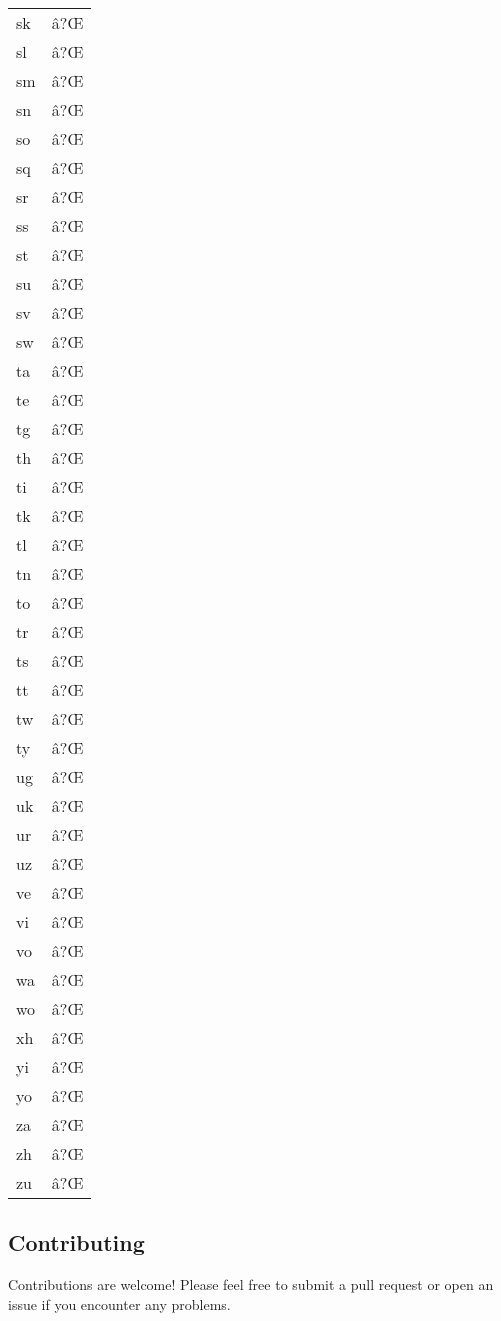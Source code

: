 \begin{longtable}[]{@{}ll@{}}
sk & â?Œ \\
sl & â?Œ \\
sm & â?Œ \\
sn & â?Œ \\
so & â?Œ \\
sq & â?Œ \\
sr & â?Œ \\
ss & â?Œ \\
st & â?Œ \\
su & â?Œ \\
sv & â?Œ \\
sw & â?Œ \\
ta & â?Œ \\
te & â?Œ \\
tg & â?Œ \\
th & â?Œ \\
ti & â?Œ \\
tk & â?Œ \\
tl & â?Œ \\
tn & â?Œ \\
to & â?Œ \\
tr & â?Œ \\
ts & â?Œ \\
tt & â?Œ \\
tw & â?Œ \\
ty & â?Œ \\
ug & â?Œ \\
uk & â?Œ \\
ur & â?Œ \\
uz & â?Œ \\
ve & â?Œ \\
vi & â?Œ \\
vo & â?Œ \\
wa & â?Œ \\
wo & â?Œ \\
xh & â?Œ \\
yi & â?Œ \\
yo & â?Œ \\
za & â?Œ \\
zh & â?Œ \\
zu & â?Œ \\
\end{longtable}

\subsection{Contributing}\label{contributing}

Contributions are welcome! Please feel free to submit a pull request or
open an issue if you encounter any problems.

